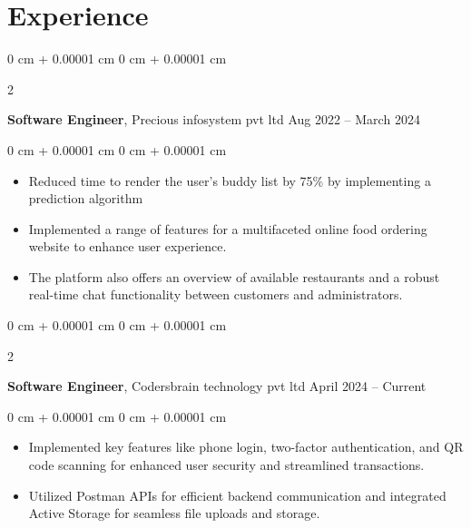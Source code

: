 \documentclass[10pt, letterpaper]{article}
\newenvironment{highlights}{
    \begin{itemize}[
        topsep=0.10 cm,
        parsep=0.10 cm,
        partopsep=0pt,
        itemsep=0pt,
        leftmargin=0 cm + 10pt
    ]
}{
    \end{itemize}
} %
\newenvironment{onecolentry}{
    \begin{adjustwidth}{
        0 cm + 0.00001 cm
    }{
        0 cm + 0.00001 cm
    }
}{
    \end{adjustwidth}
} %
\newenvironment{twocolentry}[2][]{
    \onecolentry
    \def\secondColumn{#2}
    \setcolumnwidth{\fill, 4.5 cm}
    \begin{paracol}{2}
}{
    \switchcolumn \raggedleft \secondColumn
    \end{paracol}
    \endonecolentry
} %
\begin{document}
    
    \section{Experience}



        
        \begin{twocolentry}{
            Aug 2022 – March 2024
        }
            \textbf{Software Engineer}, Precious infosystem pvt ltd \end{twocolentry}

        \vspace{0.10 cm}
        \begin{onecolentry}
            \begin{highlights}
                \item Reduced time to render the user's buddy list by 75\% by implementing a prediction algorithm
                \item Implemented a range of features for a multifaceted online food ordering website to enhance user experience.
                \item The platform also offers an overview of available restaurants and a robust real-time chat functionality between customers and administrators.
            \end{highlights}
        \end{onecolentry}


        \vspace{0.2 cm}

        \begin{twocolentry}{
            April 2024 – Current
        }
            \textbf{Software Engineer}, Codersbrain technology pvt ltd\end{twocolentry}

        \vspace{0.10 cm}
        \begin{onecolentry}
            \begin{highlights}
                \item Implemented key features like phone login, two-factor authentication, and QR code scanning for enhanced user security and streamlined transactions.
                \item Utilized Postman APIs for efficient backend communication and integrated Active Storage for seamless file uploads and storage.
            \end{highlights}
        \end{onecolentry}
\end{document}
